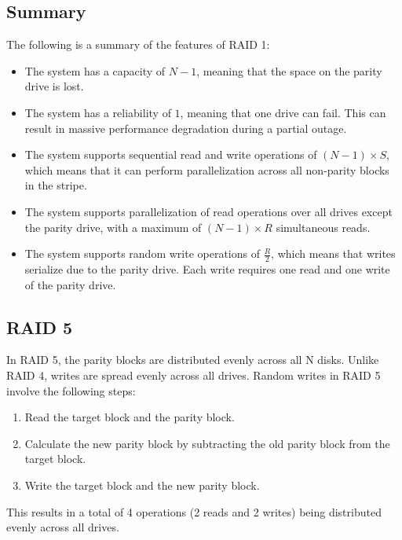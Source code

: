 \subsection{Summary}
The following is a summary of the features of RAID 1:
\begin{itemize}
    \item The system has a capacity of $N-1$, meaning that the space on the parity drive is lost. 
    \item The system has a reliability of $1$, meaning that one drive can fail. 
        This can result in massive performance degradation during a partial outage.
    \item The system supports sequential read and write operations of $(N-1)\times S$, which means that it can perform parallelization across all non-parity blocks in the stripe.
    \item The system supports parallelization of read operations over all drives except the parity drive, with a maximum of $(N-1)\times R$ simultaneous reads.
    \item The system supports random write operations of $\frac{R}{2}$, which means that writes serialize due to the parity drive. 
        Each write requires one read and one write of the parity drive.
\end{itemize}


\subsection{RAID 5}

In RAID 5, the parity blocks are distributed evenly across all N disks. 
Unlike RAID 4, writes are spread evenly across all drives.
Random writes in RAID 5 involve the following steps:
\begin{enumerate}
    \item Read the target block and the parity block.
    \item Calculate the new parity block by subtracting the old parity block from the target block.
    \item Write the target block and the new parity block.
\end{enumerate}
This results in a total of 4 operations (2 reads and 2 writes) being distributed evenly across all drives.

